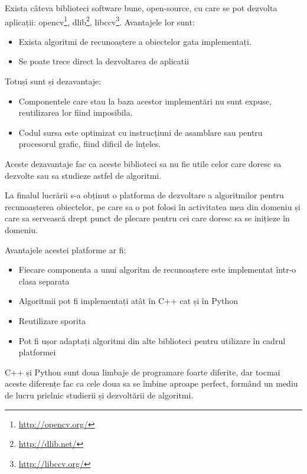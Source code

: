Exista câteva biblioteci software bune, open-source, cu care se pot dezvolta aplicații: 
opencv\footnote{\url{http://opencv.org/}}, 
dlib\footnote{\url{http://dlib.net/}}, 
libccv\footnote{\url{http://libccv.org/}}.
Avantajele lor sunt:
\begin{itemize}
	\item Exista algoritmi de recunoaștere a obiectelor gata implementați.
	\item Se poate trece direct la dezvoltarea de aplicatii
\end{itemize}
Totuși sunt și dezavantaje:
\begin{itemize}
	\item Componentele care stau la baza acestor implementări nu sunt expuse, reutilizarea lor fiind imposibila.
	\item Codul sursa este optimizat cu instrucțiuni de asamblare sau pentru procesorul grafic, fiind dificil de înțeles.
\end{itemize}
Aceste dezavantaje fac ca aceste biblioteci sa nu fie utile celor care doresc sa dezvolte sau sa studieze astfel de algoritmi.

La finalul lucrării s-a obținut o platforma de dezvoltare a algoritmilor pentru recunoașterea obiectelor, pe care sa o pot folosi în activitatea mea din domeniu și care sa servească drept punct de plecare pentru cei care doresc sa se inițieze în domeniu.

Avantajele acestei platforme ar fi:
\begin{itemize}
	\item Fiecare componenta a unui algoritm de recunoaștere este implementat într-o clasa separata
	\item Algoritmii pot fi implementați atât în C++ cat și în Python
	\item Reutilizare sporita
	\item Pot fi ușor adaptați algoritmi din alte biblioteci pentru utilizare în cadrul platformei
\end{itemize}

C++ și Python sunt doua limbaje de programare foarte diferite, dar tocmai aceste diferențe fac ca cele doua sa se îmbine aproape perfect, formând un mediu de lucru prielnic studierii și dezvoltării de algoritmi.


